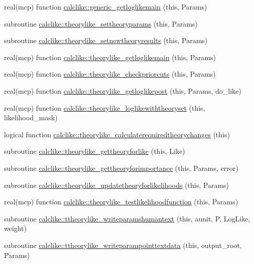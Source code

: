 \begin{DoxyCompactItemize}
\item 
real(mcp) function \mbox{\hyperlink{namespacecalclike_ab9a99016f525f639358a942fb9885cc7}{calclike\+::generic\+\_\+getloglikemain}} (this, Params)
\item 
subroutine \mbox{\hyperlink{namespacecalclike_ab9d66863dbce892dbee08483d9cdac50}{calclike\+::theorylike\+\_\+settheoryparams}} (this, Params)
\item 
subroutine \mbox{\hyperlink{namespacecalclike_a3823367d787d17f15e903222232f4b94}{calclike\+::theorylike\+\_\+setnewtheoryresults}} (this, Params)
\item 
real(mcp) function \mbox{\hyperlink{namespacecalclike_a141801e2c0e794a0411104bca9bb6809}{calclike\+::theorylike\+\_\+getloglikemain}} (this, Params)
\item 
real(mcp) function \mbox{\hyperlink{namespacecalclike_adffdc491632ae303d023f5e1b704eba4}{calclike\+::theorylike\+\_\+checkpriorcuts}} (this, Params)
\item 
real(mcp) function \mbox{\hyperlink{namespacecalclike_a27e62cb96ad63d0285283d1eb8dcec0c}{calclike\+::theorylike\+\_\+getloglikepost}} (this, Params, do\+\_\+like)
\item 
real(mcp) function \mbox{\hyperlink{namespacecalclike_a81e2854f62abdf354c1f03fc29c05d1c}{calclike\+::theorylike\+\_\+loglikewiththeoryset}} (this, likelihood\+\_\+mask)
\item 
logical function \mbox{\hyperlink{namespacecalclike_ae7eb4423ffdbadbf2df406b9d3331346}{calclike\+::theorylike\+\_\+calculaterequiredtheorychanges}} (this)
\item 
subroutine \mbox{\hyperlink{namespacecalclike_ab2d52ca5a668e5072ed6d10c161a5e88}{calclike\+::theorylike\+\_\+gettheoryforlike}} (this, Like)
\item 
subroutine \mbox{\hyperlink{namespacecalclike_ab57c11043f079701db0baf858bf6315a}{calclike\+::theorylike\+\_\+gettheoryforimportance}} (this, Params, error)
\item 
subroutine \mbox{\hyperlink{namespacecalclike_adb244129926744248e4e4f8883384b5c}{calclike\+::theorylike\+\_\+updatetheoryforlikelihoods}} (this, Params)
\item 
real(mcp) function \mbox{\hyperlink{namespacecalclike_adb2986867dcdb441b12b98cdd46cc5b5}{calclike\+::theorylike\+\_\+testlikelihoodfunction}} (this, Params)
\item 
subroutine \mbox{\hyperlink{namespacecalclike_a5c185d1a702fe31d3d1204d919b338da}{calclike\+::ttheorylike\+\_\+writeparamshumantext}} (this, aunit, P, Log\+Like, weight)
\item 
subroutine \mbox{\hyperlink{namespacecalclike_acb1cb4737fc9ec3a805214e87b444b00}{calclike\+::ttheorylike\+\_\+writeparampointtextdata}} (this, output\+\_\+root, Params)
\end{DoxyCompactItemize}
